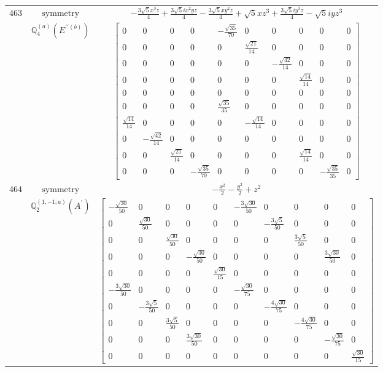 \documentclass[fleqn,8pt,landscape]{jsarticle}
\begin{document}
\begin{longtable}{ccc}
$ 463 $ & $ \text{symmetry} $ & $ - \frac{3 \sqrt{5} x^{3} z}{4} + \frac{3 \sqrt{5} i x^{2} y z}{4} - \frac{3 \sqrt{5} x y^{2} z}{4} + \sqrt{5} x z^{3} + \frac{3 \sqrt{5} i y^{3} z}{4} - \sqrt{5} i y z^{3} $ \\
$  $ & $ \mathbb{Q}_{4}^{(a)}(E^{\prime\prime(b)}) $ & $ \begin{bmatrix} 0 & 0 & 0 & 0 & - \frac{\sqrt{35}}{70} & 0 & 0 & 0 & 0 & 0 \\ 0 & 0 & 0 & 0 & 0 & \frac{\sqrt{21}}{14} & 0 & 0 & 0 & 0 \\ 0 & 0 & 0 & 0 & 0 & 0 & - \frac{\sqrt{42}}{14} & 0 & 0 & 0 \\ 0 & 0 & 0 & 0 & 0 & 0 & 0 & \frac{\sqrt{14}}{14} & 0 & 0 \\ 0 & 0 & 0 & 0 & 0 & 0 & 0 & 0 & 0 & 0 \\ 0 & 0 & 0 & 0 & \frac{\sqrt{35}}{35} & 0 & 0 & 0 & 0 & 0 \\ \frac{\sqrt{14}}{14} & 0 & 0 & 0 & 0 & - \frac{\sqrt{14}}{14} & 0 & 0 & 0 & 0 \\ 0 & - \frac{\sqrt{42}}{14} & 0 & 0 & 0 & 0 & 0 & 0 & 0 & 0 \\ 0 & 0 & \frac{\sqrt{21}}{14} & 0 & 0 & 0 & 0 & \frac{\sqrt{14}}{14} & 0 & 0 \\ 0 & 0 & 0 & - \frac{\sqrt{35}}{70} & 0 & 0 & 0 & 0 & - \frac{\sqrt{35}}{35} & 0 \end{bmatrix} $ \\ \hline
$ 464 $ & $ \text{symmetry} $ & $ - \frac{x^{2}}{2} - \frac{y^{2}}{2} + z^{2} $ \\
$  $ & $ \mathbb{Q}_{2}^{(1,-1;a)}(A^{\prime}) $ & $ \begin{bmatrix} - \frac{\sqrt{30}}{50} & 0 & 0 & 0 & 0 & - \frac{3 \sqrt{30}}{50} & 0 & 0 & 0 & 0 \\ 0 & \frac{\sqrt{30}}{50} & 0 & 0 & 0 & 0 & - \frac{3 \sqrt{5}}{50} & 0 & 0 & 0 \\ 0 & 0 & \frac{\sqrt{30}}{50} & 0 & 0 & 0 & 0 & \frac{3 \sqrt{5}}{50} & 0 & 0 \\ 0 & 0 & 0 & - \frac{\sqrt{30}}{50} & 0 & 0 & 0 & 0 & \frac{3 \sqrt{30}}{50} & 0 \\ 0 & 0 & 0 & 0 & \frac{\sqrt{30}}{15} & 0 & 0 & 0 & 0 & 0 \\ - \frac{3 \sqrt{30}}{50} & 0 & 0 & 0 & 0 & - \frac{\sqrt{30}}{75} & 0 & 0 & 0 & 0 \\ 0 & - \frac{3 \sqrt{5}}{50} & 0 & 0 & 0 & 0 & - \frac{4 \sqrt{30}}{75} & 0 & 0 & 0 \\ 0 & 0 & \frac{3 \sqrt{5}}{50} & 0 & 0 & 0 & 0 & - \frac{4 \sqrt{30}}{75} & 0 & 0 \\ 0 & 0 & 0 & \frac{3 \sqrt{30}}{50} & 0 & 0 & 0 & 0 & - \frac{\sqrt{30}}{75} & 0 \\ 0 & 0 & 0 & 0 & 0 & 0 & 0 & 0 & 0 & \frac{\sqrt{30}}{15} \end{bmatrix} $ \\ \hline

\end{longtable}
\end{document}
